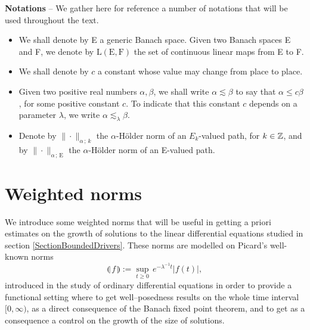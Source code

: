 \documentclass[11pt,a4paper]{amsart}
\renewcommand{\leq}{\leqslant}
\renewcommand{\geq}{\geqslant}
\numberwithin{equation}{section} %
\begin{document}
\bigskip

\noindent \textbf{Notations} -- We gather here for reference a number of notations that will be used throughout the text.
\begin{itemize}
   \item We shall denote by E a generic Banach space. Given two Banach spaces E and F, we denote by $\textrm{L}(\textrm{E},\textrm{F})$ the set of continuous linear maps from E to F. \vspace{0.1cm}
   \item We shall denote by $c$ a constant whose value may change from place to place. \vspace{0.1cm}
   \item Given two positive real numbers $\alpha,\beta$, we shall write $\alpha \lesssim \beta$ to say that $\alpha\leq c\beta$, for some positive constant $c$. To indicate that this constant $c$ depends on a parameter $\lambda$, we write $\alpha \lesssim_\lambda \beta$. \vspace{0.1cm}
   \item Denote by $\|\cdot\|_{\alpha\,;\,k}$ the $\alpha$-H\"older norm of an $E_k$-valued path, for $k\in\mathbb{Z}$, and by $\|\cdot\|_{\alpha\,;\,\textrm{E}}$ the $\alpha$-H\"older norm of an E-valued path.
\end{itemize}


\bigskip

\section{Weighted norms}
\label{SectionWeightedNorms}

We introduce  some weighted norms that will be useful in getting a priori estimates on the growth of solutions to the linear differential equations studied in section \ref{SectionBoundedDrivers}. These norms are modelled on Picard's well-known norms
$$
\llparenthesis\, f \,\rrparenthesis := \underset{t\geq 0}{\sup}\,e^{-\lambda^{-1} t}\big| f(t) \big|,
$$
introduced in the study of ordinary differential equations in order to provide a functional setting where to get well--posedness results on the whole time interval $[0,\infty)$, as a direct consequence of the Banach fixed point theorem, and to get as a consequence a control on the growth of the size of solutions. 

\medskip
\end{document}
